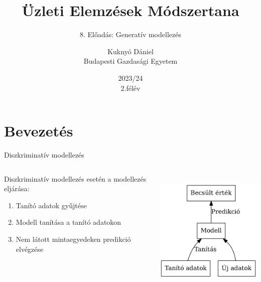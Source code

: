 \documentclass[english, aspectratio=169]{beamer}
\makeatletter
\newcommand\makebeamertitle{\frame{\maketitle}}
\let\origtableofcontents=\tableofcontents
\def\tableofcontents{\@ifnextchar[{\origtableofcontents}{\gobbletableofcontents}}
\def\gobbletableofcontents#1{\origtableofcontents}
\makeatother
\begin{document}
\section{Bevezetés}
\title[]{Üzleti Elemzések Módszertana}
\subtitle{8. Előadás: Generatív modellezés}
\author[Kuknyó Dániel]{Kuknyó Dániel\\Budapesti Gazdasági Egyetem}
\date{2023/24\\2.félév}
\makebeamertitle

\begin{frame}
\tableofcontents{}
\end{frame}

\begin{frame}
\tableofcontents[currentsection]
\end{frame}

\begin{frame}{Diszkriminatív modellezés}
\begin{columns}
\begin{column}{.5\textwidth}
Diszkriminatív modellezés esetén a modellezés eljárása:
\begin{enumerate}
	\item Tanító adatok gyűjtése
	\item Modell tanítása a tanító adatokon
	\item Nem látott mintaegyedeken predikció elvégzése
\end{enumerate}
\end{column}
\begin{column}{.5\textwidth}
\begin{center}
\includegraphics[width=6cm, height=6cm, keepaspectratio]{graphs/generative_2.png}
\end{center}
\end{column}
\end{columns}
\end{frame}
\end{document}
